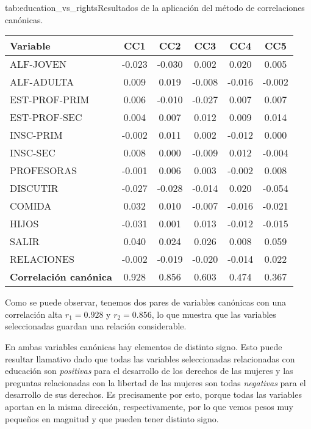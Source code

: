 \documentclass[tfg,cienciasbased,lot,lof,covers,final,overleaf,nocopyright]{tfgtfmthesisuam}
\begin{document}
\begin{table}{tab:education_vs_rights}{Resultados de la aplicación del método de correlaciones canónicas.}
    \begin{tabular}{lccccc}
        \toprule \textbf{Variable} & \textbf{CC1} & \textbf{CC2} & \textbf{CC3} & \textbf{CC4} & \textbf{CC5}\\
        \midrule
        ALF-JOVEN & -0.023 & -0.030 &  0.002 &  0.020 &  0.005\\
        ALF-ADULTA & 0.009 &  0.019 & -0.008 & -0.016 & -0.002\\
        EST-PROF-PRIM & 0.006 & -0.010 & -0.027 &  0.007 &  0.007\\
        EST-PROF-SEC & 0.004 &  0.007 &  0.012 &  0.009 &  0.014\\
        INSC-PRIM & -0.002 &  0.011 &  0.002 & -0.012 &  0.000\\
        INSC-SEC & 0.008 &  0.000 & -0.009 &  0.012 & -0.004\\
        PROFESORAS & -0.001 &  0.006 &  0.003 & -0.002 &  0.008\\
        \midrule DISCUTIR & -0.027 & -0.028 & -0.014 &  0.020 & -0.054\\
        COMIDA & 0.032 &  0.010 & -0.007 & -0.016 & -0.021\\
        HIJOS & -0.031 &  0.001 &  0.013 & -0.012 & -0.015\\
        SALIR & 0.040 &  0.024 &  0.026 &  0.008 &  0.059\\
        RELACIONES & -0.002 & -0.019 & -0.020 & -0.014 &  0.022\\
        \midrule \textbf{Correlación canónica} & 0.928 & 0.856 & 0.603 & 0.474 & 0.367\\
        \bottomrule
    \end{tabular}
\end{table}

Como se puede observar, tenemos dos pares de variables canónicas con una correlación alta $r_1 = 0\mbox{.}928$ y $r_2 = 0\mbox{.}856$, lo que muestra que las variables seleccionadas guardan una relación considerable.

En ambas variables canónicas hay elementos de distinto signo. Esto puede resultar llamativo dado que todas las variables seleccionadas relacionadas con educación son \textit{positivas} para el desarrollo de los derechos de las mujeres y las preguntas relacionadas con la libertad de las mujeres son todas \textit{negativas} para el desarrollo de sus derechos. Es precisamente por esto, porque todas las variables aportan en la misma dirección, respectivamente, por lo que vemos pesos muy pequeños en magnitud y que pueden tener distinto signo.
\end{document}
